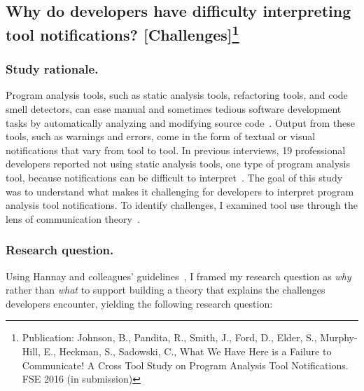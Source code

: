 \documentclass{llncs}
\begin{document}


\subsection{Why do developers have difficulty interpreting tool notifications? [Challenges]\protect\footnote{Publication: Johnson, B., Pandita, R., Smith, J., Ford, D., Elder, S., Murphy-Hill, E., Heckman, S., Sadowski, C., What We Have Here is a Failure to Communicate! A Cross Tool Study on Program Analysis Tool Notifications. FSE 2016 (in submission)}}\label{subsec:s2}
\subsubsection{Study rationale.} Program analysis tools, such as static analysis tools, refactoring tools, and code smell detectors, can ease manual and sometimes tedious software development tasks by automatically analyzing and modifying source code~\cite{adolph2011using,Murphy-Hill:2010:Ambient}. 
Output from these tools, such as warnings and errors, come in the form of textual or visual notifications that vary from tool to tool.
In previous interviews, 19 professional developers reported not using static analysis tools, one type of program analysis tool, because notifications can be difficult to interpret~\cite{johnson2013don}. The goal of this study was to understand what makes it challenging for developers to interpret program analysis tool notifications. To identify challenges, I examined tool use through the lens of communication theory~\cite{bowman1987modeling}. 

\subsubsection{Research question.}
Using Hannay and colleagues' guidelines~\cite{hannay2007systematic}, I framed my research question as \emph{why} rather than \emph{what} to support building a theory that explains the challenges developers encounter, yielding the following research question:
\end{document}
